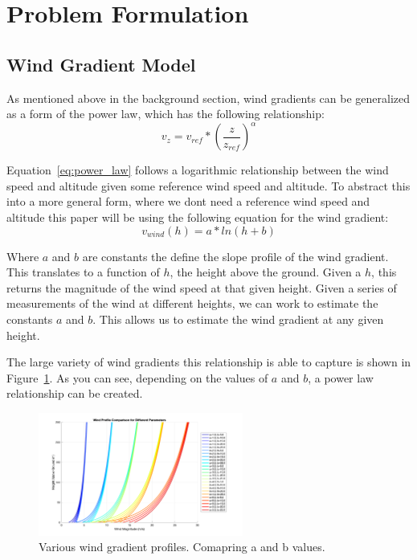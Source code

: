 \section{Problem Formulation}

\subsection{Wind Gradient Model}

As mentioned above in the background section, wind gradients can be generalized as a form of the power law, which has the following relationship:
\begin{equation}
    v_z = v_{ref} * (\frac{z}{z_{ref}})^{\alpha}  
    \label{eq:power_law}
\end{equation}

Equation~\ref{eq:power_law} follows a logarithmic relationship between the wind speed and altitude given some reference wind speed and altitude.
To abstract this into a more general form, where we dont need a reference wind speed and altitude this paper will be using the following equation for the wind gradient:
\begin{equation}
    v_{wind} (h) = a * ln(h + b)
    \label{eq:wind_gradient}
\end{equation}

Where $a$ and $b$ are constants the define the slope profile of the wind gradient. This translates to a function of $h$, the height above the ground.
Given a $h$, this returns the magnitude of the wind speed at that given height. Given a series of measurements of the wind at different heights, we can work to estimate the constants $a$ and $b$.
This allows us to estimate the wind gradient at any given height.

The large variety of wind gradients this relationship is able to capture is shown in Figure~\ref{fig:wind_gradients}.
As you can see, depending on the values of $a$ and $b$, a power law relationship can be created.

\begin{figure}[h]
    \centering
    \includegraphics[width=0.6\textwidth]{images/wind_grads.png}
    \caption{Various wind gradient profiles. Comapring a and b values.}
    \label{fig:wind_gradients}
\end{figure}

